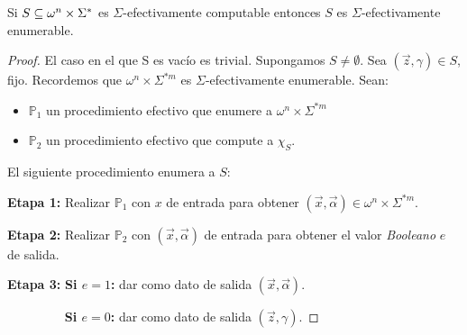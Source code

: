   \begin{lemma}
    \par Si $S \subseteq \omega^{n} \times \Sigma^{\ast}$ es $\Sigma$-efectivamente computable entonces $S$ es
    $\Sigma$-efectivamente enumerable.
  \end{lemma}
  \begin{proof}
    \par El caso en el que S es vacío es trivial. Supongamos $S \neq \emptyset$. Sea $(\vec{z}, \gamma) \in S$, fijo.
    Recordemos que $\omega^{n} \times \Sigma^{\ast m}$ es $\Sigma$-efectivamente enumerable. Sean:

    \begin{itemize}
      \item $\mathbb{P}_{1}$ un procedimiento efectivo que enumere a $\omega^{n} \times \Sigma^{\ast m}$
      \item $\mathbb{P}_{2}$ un procedimiento efectivo que compute a $\chi_{S}$.
    \end{itemize}

    \par El siguiente procedimiento enumera a $S$:

    \vspace{3mm}
    \textbf{Etapa 1:}
    Realizar $\mathbb{P}_{1}$ con $x$ de entrada para obtener $(\vec{x}, \vec{\alpha}) \in \omega^{n}\times
    \Sigma^{\ast m}$.

    \textbf{Etapa 2:}
    Realizar $\mathbb{P}_{2}$ con $(\vec{x}, \vec{\alpha})$ de entrada para obtener el valor \textit{Booleano} $e$ de
    salida.

    \textbf{Etapa 3:}
    \textbf{Si $e=1$:} dar como dato de salida $(\vec{x}, \vec{\alpha})$.

    $\qquad\qquad\;\;$\textbf{Si $e=0$:} dar como dato de salida $(\vec{z}, \gamma)$.
  \end{proof}


